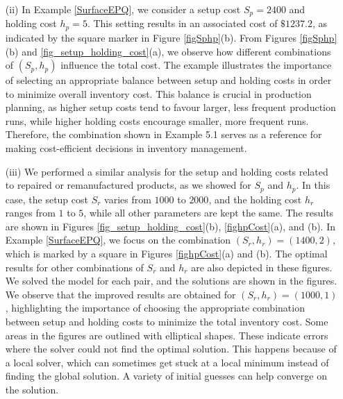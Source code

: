 \documentclass[11pt]{article}
\begin{document}
\begin{enumerate}
\item [(ii)] In Example \ref{SurfaceEPQ}, we consider a setup cost \( S_p = 2400 \) and holding cost \( h_p = 5 \). This setting results in an associated cost of $\$ 1237.2$, as indicated by the square marker in Figure \ref{figSphp}(b). From Figures \ref{figSphp}(b) and \ref{fig_setup_holding_cost}(a), we observe how different combinations of $(S_p, h_p)$ influence the total cost. The example illustrates the importance of selecting an appropriate balance between setup and holding costs in order to minimize overall inventory cost. This balance is crucial in production planning, as higher setup costs tend to favour larger, less frequent production runs, while higher holding costs encourage smaller, more frequent runs. Therefore, the combination shown in Example 5.1 serves as a reference for making cost-efficient decisions in inventory management.
\item [(iii)] We performed a similar analysis for the setup and holding costs related to repaired or remanufactured products, as we showed for $S_p$ and $h_p$. In this case, the setup cost $S_r$ varies from $1000$ to $2000$, and the holding cost $h_r$ ranges from $1$ to $5$, while all other parameters are kept the same. The results are shown in Figures \ref{fig_setup_holding_cost}(b), \ref{fighpCost}(a), and (b). In Example \ref{SurfaceEPQ}, we focus on the combination $(S_r, h_r) = (1400, 2)$, which is marked by a square in Figures \ref{fighpCost}(a) and (b). The optimal results for other combinations of $S_r$ and $h_r$ are also depicted in these figures. We solved the model for each pair, and the solutions are shown in the figures. We observe that the improved results are obtained for $(S_r, h_r) = (1000, 1)$, highlighting the importance of choosing the appropriate combination between setup and holding costs to minimize the total inventory cost.
 Some areas in the figures are outlined with elliptical shapes. These indicate errors where the solver could not find the optimal solution. This happens because of a local solver, which can sometimes get stuck at a local minimum instead of finding the global solution. A variety of initial guesses can help converge on the solution.


\end{enumerate}
\end{document}
